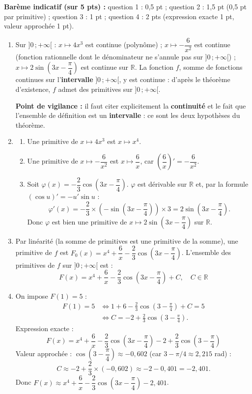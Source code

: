 \documentclass[11pt]{article}
\begin{document}
\begin{corrige}
\textbf{Barème indicatif (sur 5 pts) :} question 1 : 0,5 pt ; question 2 : 1,5 pt (0,5 pt par primitive) ; question 3 : 1 pt ; question 4 : 2 pts (expression exacte 1 pt, valeur approchée 1 pt).

\begin{enumerate}
\item Sur $]0\,;+\infty[$ : $x \mapsto 4x^3$ est continue (polynôme) ; $x \mapsto -\dfrac{6}{x^2}$ est continue (fonction rationnelle dont le dénominateur ne s'annule pas sur $]0\,;+\infty[$) ; $x \mapsto 2\sin\left(3x - \dfrac{\pi}{4}\right)$ est continue sur $\mathbb{R}$. La fonction $f$, somme de fonctions continues sur l'\textbf{intervalle} $]0\,;+\infty[$, y est continue : d'après le théorème d'existence, $f$ admet des primitives sur $]0\,;+\infty[$.

\textbf{Point de vigilance :} il faut citer explicitement la \textbf{continuité} et le fait que l'ensemble de définition est un \textbf{intervalle} : ce sont les deux hypothèses du théorème.
\item \begin{enumerate}
\item Une primitive de $x \mapsto 4x^3$ est $x \mapsto x^4$.
\item Une primitive de $x \mapsto -\dfrac{6}{x^2}$ est $x \mapsto \dfrac{6}{x}$, car $\left(\dfrac{6}{x}\right)' = -\dfrac{6}{x^2}$.
\item Soit $\varphi(x) = -\dfrac{2}{3}\cos\left(3x - \dfrac{\pi}{4}\right)$. $\varphi$ est dérivable sur $\mathbb{R}$ et, par la formule $(\cos u)' = -u'\sin u$ :
\[ \varphi'(x) = -\frac{2}{3} \times \left(-\sin\left(3x - \frac{\pi}{4}\right)\right) \times 3 = 2\sin\left(3x - \frac{\pi}{4}\right). \]
Donc $\varphi$ est bien une primitive de $x \mapsto 2\sin\left(3x - \dfrac{\pi}{4}\right)$ sur $\mathbb{R}$.
\end{enumerate}
\item Par linéarité (la somme de primitives est une primitive de la somme), une primitive de $f$ est $F_0(x) = x^4 + \dfrac{6}{x} - \dfrac{2}{3}\cos\left(3x - \dfrac{\pi}{4}\right)$. L'ensemble des primitives de $f$ sur $]0\,;+\infty[$ est :
\[ \boxed{F(x) = x^4 + \frac{6}{x} - \frac{2}{3}\cos\left(3x - \frac{\pi}{4}\right) + C, \quad C \in \mathbb{R}} \]
\item On impose $F(1) = 5$ :
\begin{align*}
F(1) = 5 &\iff 1 + 6 - \frac{2}{3}\cos\left(3 - \frac{\pi}{4}\right) + C = 5 \\
&\iff C = -2 + \frac{2}{3}\cos\left(3 - \frac{\pi}{4}\right).
\end{align*}
Expression exacte :
\[ \boxed{F(x) = x^4 + \frac{6}{x} - \frac{2}{3}\cos\left(3x - \frac{\pi}{4}\right) - 2 + \frac{2}{3}\cos\left(3 - \frac{\pi}{4}\right)} \]
Valeur approchée : $\cos\left(3 - \dfrac{\pi}{4}\right) \approx -0,602$ (car $3 - \pi/4 \approx 2,215$ rad) :
\[ C \approx -2 + \frac{2}{3} \times (-0,602) \approx -2 - 0,401 = -2,401. \]
Donc $F(x) \approx x^4 + \dfrac{6}{x} - \dfrac{2}{3}\cos\left(3x - \dfrac{\pi}{4}\right) - 2,401$.


\end{enumerate}
\end{corrige}
\end{document}
